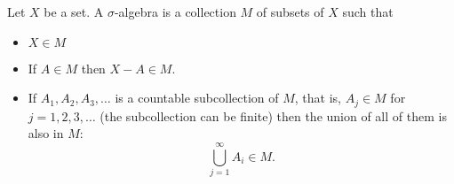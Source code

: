 \documentclass[12pt]{article}
\begin{document}
Let $X$ be a set. A $\sigma$-algebra is a collection $M$ of subsets of $X$ such that
\begin{itemize}
\item $X\in M$
\item If $A\in M$ then $X-A\in M$.
\item If $A_1,A_2,A_3,\ldots$ is a countable subcollection of $M$, that is, $A_j\in M$ for $j=1,2,3,\ldots$ (the subcollection can be finite) then the union of all of them is also in $M$:
\[\bigcup_{j=1}^\infty A_i\in M.\]
\end{itemize}
\end{document}
